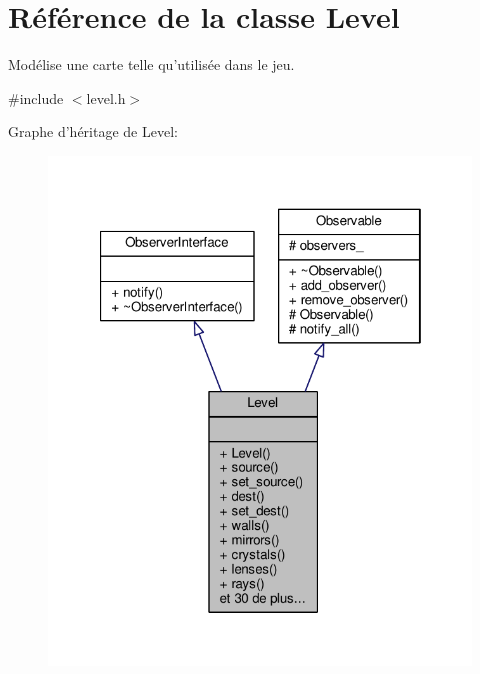 \hypertarget{classLevel}{\section{Référence de la classe Level}
\label{classLevel}
}


Modélise une carte telle qu'utilisée dans le jeu.  




{\ttfamily \#include $<$level.\+h$>$}



Graphe d'héritage de Level\+:\nopagebreak
\begin{figure}[H]
\begin{center}
\leavevmode
\includegraphics[width=321pt]{dd/d9f/classLevel__inherit__graph}
\end{center}
\end{figure}


